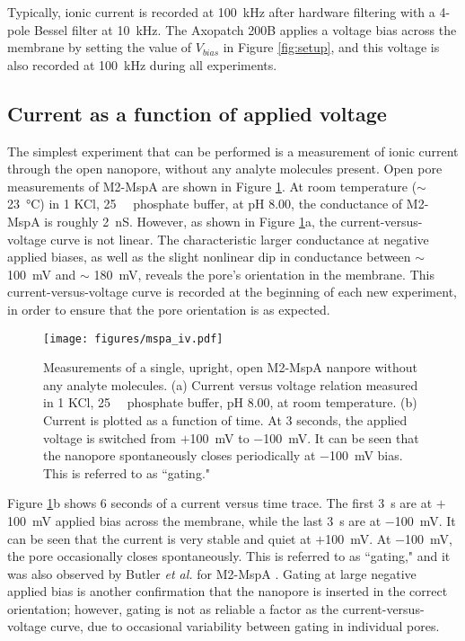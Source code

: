 Typically, ionic current is recorded at \SI{100}{\kHz} after hardware filtering with a 4-pole Bessel filter at \SI{10}{\kHz}.  The Axopatch 200B applies a voltage bias across the membrane by setting the value of $V_{bias}$ in Figure \ref{fig:setup}, and this voltage is also recorded at \SI{100}{\kHz} during all experiments.

\subsection{Current as a function of applied voltage}

The simplest experiment that can be performed is a measurement of ionic current through the open nanopore, without any analyte molecules present.  Open pore measurements of M2-MspA are shown in Figure \ref{fig:iv_mspa}.  At room temperature ($\sim$ \SI{23}{\degreeCelsius}) in \SI{1}{\Molar} KCl, \SI{25}{\milli\Molar} phosphate buffer, at pH \num{8.00}, the conductance of M2-MspA is roughly \SI{2}{\nano\siemens}.  However, as shown in Figure \ref{fig:iv_mspa}a, the current-versus-voltage curve is not linear.  The characteristic larger conductance at negative applied biases, as well as the slight nonlinear dip in conductance between $\sim$ \SI{100}{\mV} and $\sim$ \SI{180}{\mV}, reveals the pore's orientation in the membrane.  This current-versus-voltage curve is recorded at the beginning of each new experiment, in order to ensure that the pore orientation is as expected.

\begin{figure}[h]
\begin{centering}
\texttt{[image: figures/mspa\_iv.pdf]}
\caption[MspA current versus voltage]{Measurements of a single, upright, open M2-MspA nanpore without any analyte molecules.  (a) Current versus voltage relation measured in \SI{1}{\Molar} KCl, \SI{25}{\milli\Molar} phosphate buffer, pH \num{8.00}, at room temperature.  (b) Current is plotted as a function of time.  At \num{3} seconds, the applied voltage is switched from $+$\SI{100}{\milli\volt} to \SI{-100}{\milli\volt}.  It can be seen that the nanopore spontaneously closes periodically at \SI{-100}{\milli\volt} bias.  This is referred to as ``gating."}
\label{fig:iv_mspa}
\end{centering}
\end{figure}

Figure \ref{fig:iv_mspa}b shows \num{6} seconds of a current versus time trace.  The first \SI{3}{\s} are at $+$\SI{100}{\mV} applied bias across the membrane, while the last \SI{3}{\s} are at $-$\SI{100}{\mV}.  It can be seen that the current is very stable and quiet at $+$\SI{100}{\mV}.  At $-$\SI{100}{\mV}, the pore occasionally closes spontaneously.  This is referred to as ``gating," and it was also observed by Butler \textit{et al.} for M2-MspA \citep{Butler2008}.  Gating at large negative applied bias is another confirmation that the nanopore is inserted in the correct orientation; however, gating is not as reliable a factor as the current-versus-voltage curve, due to occasional variability between gating in individual pores.


